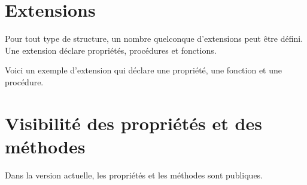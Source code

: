 \section{Extensions}

Pour tout type de structure, un nombre quelconque d'extensions peut être défini. Une extension déclare propriétés, procédures et fonctions.

Voici un exemple d'extension qui déclare une propriété, une fonction et une procédure.







\section{Visibilité des propriétés et des méthodes}

Dans la version actuelle, les propriétés et les méthodes sont publiques.



